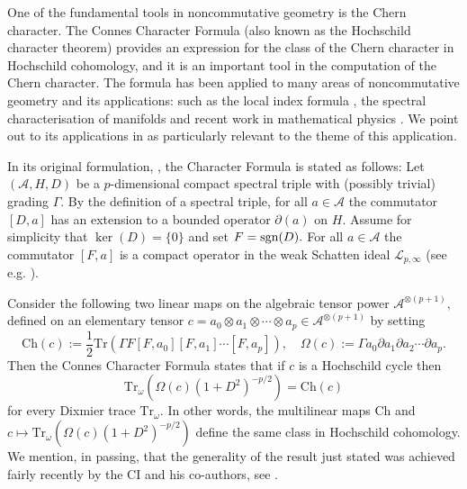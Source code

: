 \documentclass[12pt]{article}
\begin{document}
One of the fundamental tools in noncommutative geometry is the Chern character. The Connes Character Formula (also known as the Hochschild character theorem) provides an expression for the class of the Chern character in Hochschild cohomology, and it is an important tool in the computation of the Chern character. The formula has been applied to many areas     of noncommutative geometry and its applications: such as the local index formula \cite{ConnesMoscovici}, the spectral characterisation of manifolds \cite{Connes-reconstruction} and recent work in mathematical physics \cite{Connes-Chamseddine-Mukhanov-quanta-of-geometry-2015}. We point out to its applications in \cite{Connes-reconstruction} as particularly relevant to the theme of this application.

In its original formulation, \cite{Connes-original-spectral-1995}, the Character Formula is stated as follows: Let $(\mathcal{A},H,D)$ be a $p$-dimensional compact spectral triple     with (possibly trivial) grading $\Gamma.$ By the definition of a spectral triple, for all $a \in \mathcal{A}$ the commutator $[D,a]$ has an extension to a bounded operator $\partial(a)$ on $H.$ Assume for simplicity that $\ker(D)=\{0\}$ and set $F={\rm sgn}(D).$ For all $a \in \mathcal{A}$ the commutator $[F,a]$ is a compact operator in the weak Schatten ideal $\mathcal{L}_{p,\infty}$ (see e.g. \cite{Connes-book, book}).

Consider the following two linear maps on the algebraic tensor power $\mathcal{A}^{\otimes(p+1)},$ defined on an elementary tensor $c = a_0\otimes a_1\otimes \cdots \otimes a_p \in \mathcal{A}^{\otimes(p+1)}$ by setting
$$\mathrm{Ch}(c) := \frac{1}{2}\mathrm{Tr}(\Gamma F[F,a_0][F,a_1]\cdots[F,a_p]),\quad \Omega(c) := \Gamma a_0\partial a_1\partial a_2\cdots \partial a_p.$$
Then the Connes Character Formula states that if $c$ is a Hochschild cycle then
\begin{equation*}
\mathrm{Tr}_\omega(\Omega(c)(1+D^2)^{-p/2}) = \mathrm{Ch}(c)
\end{equation*}
for every Dixmier trace $\mathrm{Tr}_\omega$. In other words, the multilinear maps $\mathrm{Ch}$ and $c \mapsto \mathrm{Tr}_\omega(\Omega(c)(1+D^2)^{-p/2})$ define the same class in Hochschild cohomology. We mention, in passing, that the generality of the result just stated was achieved fairly recently by the CI and his co-authors, see \cite{CRSZ}.
    
\end{document}
